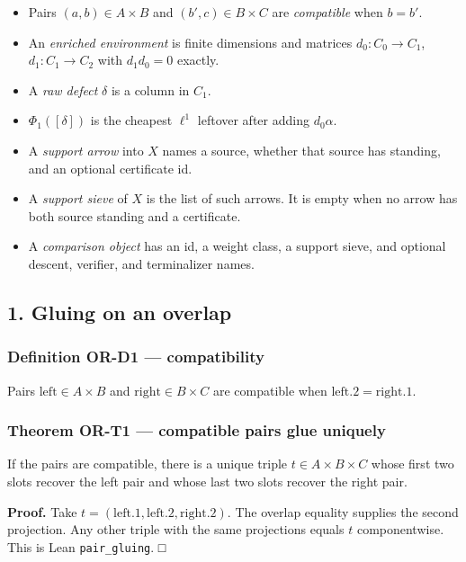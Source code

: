 \documentclass[
  11pt,
]{article}
\providecommand{\tightlist}{%
  \setlength{\itemsep}{0pt}\setlength{\parskip}{0pt}}
\begin{document}
\begin{itemize}
\tightlist
\item
  Pairs \((a,b)\in A\times B\) and \((b',c)\in B\times C\) are \emph{compatible} when \(b=b'\).
\item
  An \emph{enriched environment} is finite dimensions and matrices \(d_0\colon C_0\to C_1\), \(d_1\colon C_1\to C_2\) with \(d_1 d_0=0\) exactly.
\item
  A \emph{raw defect} \(\delta\) is a column in \(C_1\).
\item
  \(\Phi_1([\delta])\) is the cheapest \(\ell^1\) leftover after adding \(d_0\alpha\).
\item
  A \emph{support arrow} into \(X\) names a source, whether that source has standing, and an optional certificate id.
\item
  A \emph{support sieve} of \(X\) is the list of such arrows. It is empty when no arrow has both source standing and a certificate.
\item
  A \emph{comparison object} has an id, a weight class, a support sieve, and optional descent, verifier, and terminalizer names.
\end{itemize}

\subsection{1. Gluing on an overlap}\label{gluing-on-an-overlap}

\subsubsection{Definition OR-D1 --- compatibility}\label{definition-or-d1-compatibility}

Pairs \(\mathrm{left}\in A\times B\) and \(\mathrm{right}\in B\times C\) are compatible when \(\mathrm{left}.2=\mathrm{right}.1\).

\subsubsection{Theorem OR-T1 --- compatible pairs glue uniquely}\label{theorem-or-t1-compatible-pairs-glue-uniquely}

If the pairs are compatible, there is a unique triple \(t\in A\times B\times C\) whose first two slots recover the left pair and whose last two slots recover the right pair.

\textbf{Proof.} Take \(t=(\mathrm{left}.1,\mathrm{left}.2,\mathrm{right}.2)\). The overlap equality supplies the second projection. Any other triple with the same projections equals \(t\) componentwise. This is Lean \texttt{pair\_gluing}. □
\end{document}
